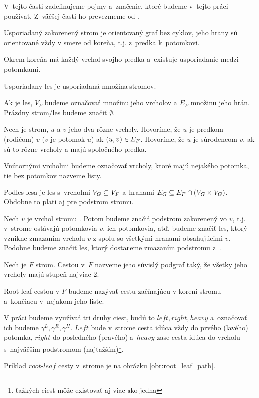 V~tejto časti zadefinujeme pojmy a~značenie, ktoré budeme v~tejto práci používať.
Z~väčšej časti ho prevezmeme od \citet{RTED}.

\begin{definice}\label{def:strom}
  Usporiadaný zakorenený strom je orientovaný graf bez cyklov,
  jeho hrany sú orientované vždy v smere od koreňa, t.j. z~predka k~potomkovi.

  Okrem koreňa má každý vrchol svojho predka a~existuje usporiadanie medzi potomkami.

  Usporiadany les je usporiadaná množina stromov.
\end{definice}

Ak  je les, $V_F$ budeme označovať množinu jeho vrcholov a $E_F$ množinu jeho hrán.
Prázdny strom/les budeme značiť $\emptyset$.

\begin{definice}
  \label{def:stromove_pojmy}
  Nech  je strom, $u$ a $v$ jeho dva rôzne vrcholy.
  Hovoríme, že $u$ je predkom (rodičom) $v$ ($v$ je potomok $u$) ak $(u, v) \in E_{F}$.
  Hovoríme, že $u$ je súrodencom $v$, ak sú to rôzne vrcholy a majú spoločného predka.
\end{definice}

Vnútornými vrcholmi budeme označovať vrcholy, ktoré majú nejakého potomka,
tie bez potomkov nazveme listy.

Podles lesa  je les  s~vrcholmi $V_{G} \subseteq V_{F}$
a~hranami $E_{G} \subseteq E_{F} \cap (V_{G} \times V_{G})$.
Obdobne to plati aj pre podstrom stromu.

Nech $v$ je vrchol stromu . Potom  budeme značiť podstrom  zakorenený vo $v$,
t.j. v~strome ostávajú potomkovia $v$, ich potomkovia, atď.
 budeme značiť les, ktorý vznikne zmazaním vrcholu $v$ z  spolu so
všetkými hranami obsahujúcimi $v$. Podobne  budeme značiť les, ktorý
dostaneme zmazaním podstromu  z~.

\begin{definice}
  Nech je $F$ strom. Cestou v~$F$ nazveme jeho súvislý podgraf taký, že všetky jeho vrcholy
  majú stupeň najviac 2.

  Root-leaf cestou v $F$ budeme nazývať cestu začínajúcu v koreni stromu \sloppy\mbox{a končiacu}
  v~nejakom jeho liste.
\end{definice}

V práci budeme využívať tri druhy ciest, budú to $left, right, heavy$ a~označovať ich
budeme $\gamma^L, \gamma^R, \gamma^H$. $Left$ bude v~strome cesta idúca vždy do prvého (ľavého)
potomka, $right$ do posledného (pravého) a~$heavy$ zase cesta idúca do vrcholu s~najväčším
podstromom (najťažším)\footnote{ťažkých ciest môže existovať aj viac ako jedna}.

Príklad $root$-$leaf$ cesty v~strome je na obrázku \ref{obr:root_leaf_path}.



